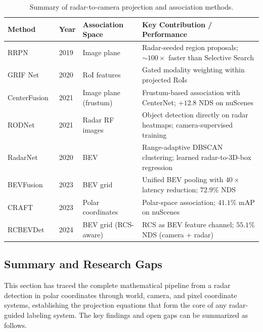 \begin{table}[t]
  \centering
  \caption{Summary of radar-to-camera projection and association methods.}
  \label{tab:projection_methods}
  \small
  \begin{tabularx}{\textwidth}{l l l X}
    \toprule
    \textbf{Method} & \textbf{Year} & \textbf{Association Space} & \textbf{Key Contribution / Performance} \\
    \midrule
    RRPN~\cite{nabati2019rrpn}
      & 2019 & Image plane
      & Radar-seeded region proposals; ${\sim}100\times$ faster than Selective Search \\
    GRIF Net~\cite{Kim2020GRIFNet}
      & 2020 & RoI features
      & Gated modality weighting within projected RoIs \\
    CenterFusion~\cite{Nabati2021CenterFusion}
      & 2021 & Image plane (frustum)
      & Frustum-based association with CenterNet; $+12.8$ NDS on nuScenes \\
    RODNet~\cite{wang2021rodnet}
      & 2021 & Radar RF images
      & Object detection directly on radar heatmaps; camera-supervised training \\
    RadarNet~\cite{schumann2020radarnet}
      & 2020 & BEV
      & Range-adaptive DBSCAN clustering; learned radar-to-3D-box regression \\
    BEVFusion~\cite{liu2023bevfusion}
      & 2023 & BEV grid
      & Unified BEV pooling with $40\times$ latency reduction; $72.9\%$ NDS \\
    CRAFT~\cite{Kim2022CRAFT}
      & 2023 & Polar coordinates
      & Polar-space association; $41.1\%$ mAP on nuScenes \\
    RCBEVDet~\cite{Lin2024RCBEVDet}
      & 2024 & BEV grid (RCS-aware)
      & RCS as BEV feature channel; $55.1\%$ NDS (camera + radar) \\
    \bottomrule
  \end{tabularx}
\end{table}

\subsection{Summary and Research Gaps}\label{subsec:projection_gaps}

This section has traced the complete mathematical pipeline from a radar detection in polar coordinates through world, camera, and pixel coordinate systems, establishing the projection equations that form the core of any radar-guided labeling system. The key findings and open gaps can be summarized as follows.


